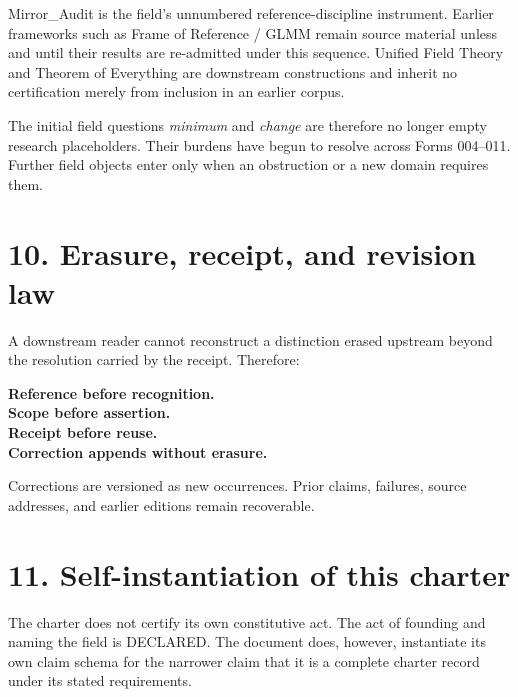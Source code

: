 \documentclass[10.5pt]{article}
\newcommand{\status}[1]{\textsf{#1}}
\begin{document}
Mirror\_Audit is the field's unnumbered reference-discipline instrument. Earlier frameworks such as Frame of Reference / GLMM remain source material unless and until their results are re-admitted under this sequence. Unified Field Theory and Theorem of Everything are downstream constructions and inherit no certification merely from inclusion in an earlier corpus.

The initial field questions \emph{minimum} and \emph{change} are therefore no longer empty research placeholders. Their burdens have begun to resolve across Forms 004--011. Further field objects enter only when an obstruction or a new domain requires them.

\section*{10. Erasure, receipt, and revision law}
A downstream reader cannot reconstruct a distinction erased upstream beyond the resolution carried by the receipt. Therefore:
\begin{rulebox}
\centering
\textbf{Reference before recognition.}\\
\textbf{Scope before assertion.}\\
\textbf{Receipt before reuse.}\\
\textbf{Correction appends without erasure.}
\end{rulebox}
Corrections are versioned as new occurrences. Prior claims, failures, source addresses, and earlier editions remain recoverable.

\section*{11. Self-instantiation of this charter}
The charter does not certify its own constitutive act. The act of founding and naming the field is \status{DECLARED}. The document does, however, instantiate its own claim schema for the narrower claim that it is a complete charter record under its stated requirements.
\end{document}
